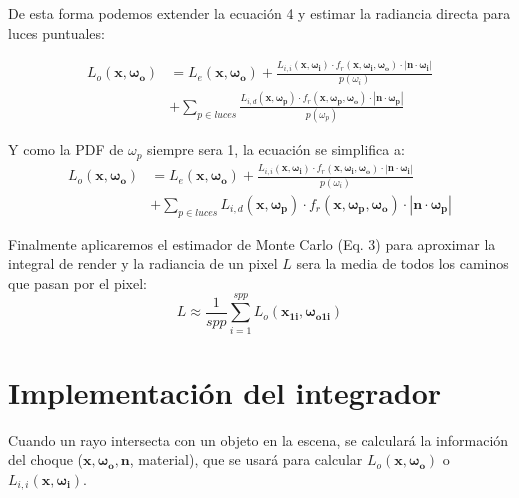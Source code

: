 \documentclass{article}
\begin{document}
De esta forma podemos extender la ecuación 4 y estimar la radiancia directa para
luces puntuales:

\begin{equation}
  \begin{split}
    L_o(\mathbf{x}, \mathbf{\omega_{o}}) & = L_e(\mathbf{x}, \mathbf{\omega_{o}}) + \frac{L_{i,i}(\mathbf{x}, \mathbf{\omega_{i}}) \cdot f_r(\mathbf{x}, \mathbf{\omega_{i}}, \mathbf{\omega_{o}}) \cdot  |\mathbf{n} \cdot \mathbf{\omega_{i}}|}{p(\omega_{i})} \\
                                         & + \sum_{p \in luces} \frac{L_{i,d}(\mathbf{x}, \mathbf{\omega_{p}}) \cdot f_r(\mathbf{x}, \mathbf{\omega_{p}}, \mathbf{\omega_{o}}) \cdot  |\mathbf{n} \cdot \mathbf{\omega_{p}}|}{p(\omega_{p})}
  \end{split}
\end{equation}

Y como la PDF de \(\omega_{p}\) siempre sera 1, la ecuación se simplifica a:
\begin{equation}
  \begin{split}
    L_o(\mathbf{x}, \mathbf{\omega_{o}}) & = L_e(\mathbf{x}, \mathbf{\omega_{o}}) + \frac{L_{i,i}(\mathbf{x}, \mathbf{\omega_{i}}) \cdot f_r(\mathbf{x}, \mathbf{\omega_{i}}, \mathbf{\omega_{o}}) \cdot  |\mathbf{n} \cdot \mathbf{\omega_{i}}|}{p(\omega_{i})} \\
                                         & + \sum_{p \in luces} L_{i,d}(\mathbf{x}, \mathbf{\omega_{p}}) \cdot f_r(\mathbf{x}, \mathbf{\omega_{p}}, \mathbf{\omega_{o}}) \cdot  |\mathbf{n} \cdot \mathbf{\omega_{p}}|
  \end{split}
\end{equation}

Finalmente aplicaremos el estimador de Monte Carlo (Eq. 3) para aproximar la
integral de render y la radiancia de un pixel \(L\) sera la media de todos los
caminos que pasan por el pixel:
\begin{equation}
  L \approx \frac{1}{spp} \sum_{i=1}^{spp} L_{o}(\mathbf{x_{1i}}, \mathbf{\omega_{o1i}})
\end{equation}

\section{Implementación del integrador}
Cuando un rayo intersecta con un objeto en la escena, se calculará la
información del choque (\(\mathbf{x}, \mathbf{\omega_{o}}, \mathbf{n}\),
material), que se usará para calcular \(L_o(\mathbf{x}, \mathbf{\omega_{o}})\) o
\(L_{i,i}(\mathbf{x}, \mathbf{\omega_{i}}) \).
\end{document}
